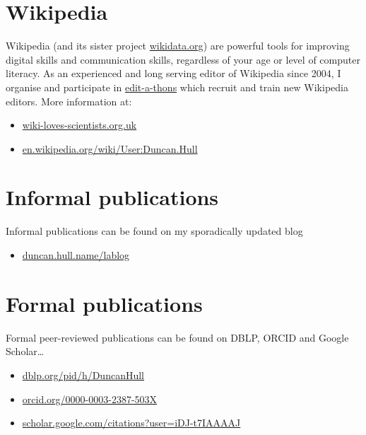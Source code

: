 \documentclass[12pt,]{book}
\providecommand{\tightlist}{%
  \setlength{\itemsep}{0pt}\setlength{\parskip}{0pt}}
\begin{document}
\hypertarget{wikipedia}{%
\section{Wikipedia}\label{wikipedia}}

Wikipedia (and its sister project \href{https://www.wikidata.org}{wikidata.org}) are powerful tools for improving digital skills and communication skills, regardless of your age or level of computer literacy. As an experienced and long serving editor of Wikipedia since 2004, I organise and participate in \href{https://en.wikipedia.org/wiki/Edit-a-thon}{edit-a-thons} which recruit and train new Wikipedia editors. More information at:

\begin{itemize}
\tightlist
\item
  \href{https://wiki-loves-scientists.org.uk/}{wiki-loves-scientists.org.uk}
\item
  \href{https://en.wikipedia.org/wiki/User:Duncan.Hull}{en.wikipedia.org/wiki/User:Duncan.Hull}
\end{itemize}

\hypertarget{informal-publications}{%
\section{Informal publications}\label{informal-publications}}

Informal publications can be found on my sporadically updated blog

\begin{itemize}
\tightlist
\item
  \href{https://duncan.hull.name/lablog/}{duncan.hull.name/lablog}
\end{itemize}

\hypertarget{formal-publications}{%
\section{Formal publications}\label{formal-publications}}

Formal peer-reviewed publications can be found on DBLP, ORCID and Google Scholar\ldots{}

\begin{itemize}
\tightlist
\item
  \href{https://dblp.org/pid/h/DuncanHull}{dblp.org/pid/h/DuncanHull}
\item
  \href{https://orcid.org/0000-0003-2387-503X}{orcid.org/0000-0003-2387-503X}
\item
  \href{https://scholar.google.com/citations?user=iDJ-t7IAAAAJ}{scholar.google.com/citations?user=iDJ-t7IAAAAJ}
\end{itemize}
\end{document}
